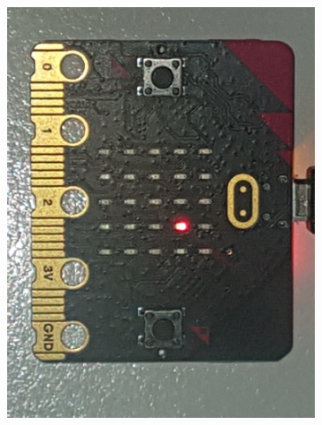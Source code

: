 \begin{figure}[h!]
\begin{subfigure}[b]{0.19\textwidth}
		\end{subfigure}
		\begin{subfigure}[b]{0.19\textwidth}
			\includegraphics[width=.98\linewidth]{figuren/matrix/mTwee}
		\end{subfigure}		
		\begin{subfigure}[b]{0.19\textwidth}

\end{subfigure}
\end{figure}

